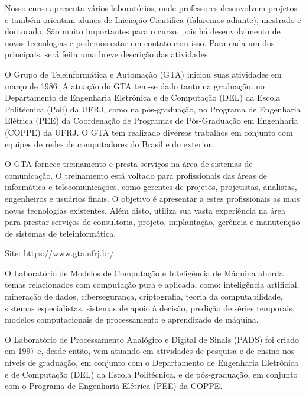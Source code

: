     
		Nosso curso apresenta vários laboratórios, onde professores desenvolvem projetos e também orientam alunos de Iniciação Científica (falaremos adiante), mestrado e doutorado. São muito importantes para o curso, pois há desenvolvimento de novas tecnologias e podemos estar em contato com isso. Para cada um dos principais, será feita uma breve descrição das atividades.

        	O Grupo de Teleinformática e Automação (GTA) iniciou suas atividades em março de 1986. A atuação do GTA tem-se dado tanto na graduação, no Departamento de Engenharia Eletrônica e de Computação (DEL) da Escola Politécnica (Poli) da UFRJ, como na pós-graduação, no Programa de Engenharia Elétrica (PEE) da Coordenação de Programas de Pós-Graduação em Engenharia (COPPE) da UFRJ. O GTA tem realizado diversos trabalhos em conjunto com equipes de redes de computadores do Brasil e do exterior.

        	O GTA fornece treinamento e presta serviços na área de sistemas de comunicação. O treinamento está voltado para profissionais das áreas de informática e telecomunicações, como gerentes de projetos, projetistas, analistas, engenheiros e usuários finais. O objetivo é apresentar a estes profissionais as mais novas tecnologias existentes. Além disto, utiliza sua vasta experiência na área para prestar serviços de consultoria, projeto, implantação, gerência e manutenção de sistemas de teleinformática.

        \href{https://www.gta.ufrj.br/}{Site: https://www.gta.ufrj.br/}
        
        	O Laboratório de Modelos de Computação e Inteligência de Máquina
        aborda temas relacionados com computação pura e aplicada, como:
        inteligência artificial, mineração de dados, cibersegurança,
        criptografia, teoria da computabilidade, sistemas especialistas,
        sistemas de apoio à decisão, predição de séries temporais, modelos
        computacionais de processamento e aprendizado de máquina.
        
        	O Laboratório de Processamento Analógico e Digital de Sinais (PADS) foi criado em 1997 e, desde então, vem atuando em atividades de pesquisa e de ensino nos níveis de graduação, em conjunto com o Departamento de Engenharia Eletrônica e de Computação (DEL) da Escola Politécnica, e de pós-graduação, em conjunto com o Programa de Engenharia Elétrica (PEE) da COPPE.

